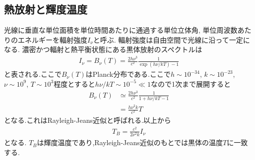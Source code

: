 \subsection{熱放射と輝度温度}
光線に垂直な単位面積を単位時間あたりに通過する単位立体角,
単位周波数あたりのエネルギーを輻射強度$I_{\nu}$と呼ぶ.
輻射強度は自由空間で光線に沿って一定になる.
濃密かつ輻射と熱平衡状態にある黒体放射のスペクトルは
\begin{align}
  \label{equ:I-B}
  I_{\nu}=B_{\nu}(T)=\frac{2h\nu^3}{c^2}\frac{1}{\exp(h\nu/kT)-1}
\end{align}
と表される.ここで$B_{\nu}(T)$はPlanck分布である.ここで$h\sim10^{-34}$, $k\sim10^{-23}$,
$\nu\sim10^9$, $T\sim10^3$程度とすると$h\nu/kT\sim10^{-5}\ll1$なので1次まで展開すると
\begin{align}
  \label{equ:rayleigh-jeans}
  B_\nu(T)&\simeq\frac{2h\nu^3}{c^2}\frac{1}{1+h\nu/kT-1}\nonumber\\
  &=\frac{h\nu^2k}{c^2}T
\end{align}
となる.これはRayleigh-Jeans近似と呼ばれる.以上から
\begin{align}
  \label{equ:T_B}
  T_B=\frac{c^2}{2\nu^2k}I_\nu
\end{align}
となる.
$T_B$は輝度温度であり,Rayleigh-Jeans近似のもとでは黒体の温度$T$に一致する.